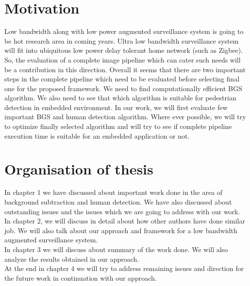 \section{Motivation}
\indent Low bandwidth along with low power augmented surveillance system
is going to be hot research area in coming years. Ultra low bandwidth
surveillance system will fit into ubiquitous low power delay tolerant
home network (such as Zigbee). So, the evaluation of a complete image
pipeline which can cater such needs will be a contribution in this
direction. Overall it seems that there are two important steps in the
complete pipeline which need to be evaluated before selecting final one
for the proposed framework. We need to find computationally efficient
BGS algorithm. We also need to see that which algorithm is suitable for
pedestrian detection in embedded environment.  In our work, we will
first evaluate few important BGS and human detection algorithm.  Where
ever possible, we will try to optimize finally selected algorithm and
will try to see if complete pipeline execution time is suitable for an
embedded application or not.\\
\section{Organisation of thesis}

\indent In chapter 1 we have discussed about important work done in the
area of background subtraction and human detection. We have also
discussed about outstanding issues and the issues which we are going to
address with our work.\\

\indent In chapter 2, we will discuss in detail about how other authors
have done similar job. We will also talk about our approach and
framework for a low bandwidth augmented surveillance system.\\

\indent In chapter 3 we will discuss about summary of the work done. We
will also analyze the results obtained in our approach.\\

\indent At the end in chapter 4 we will try to address remaining issues
and direction for the future work in continuation with our approach.\\


